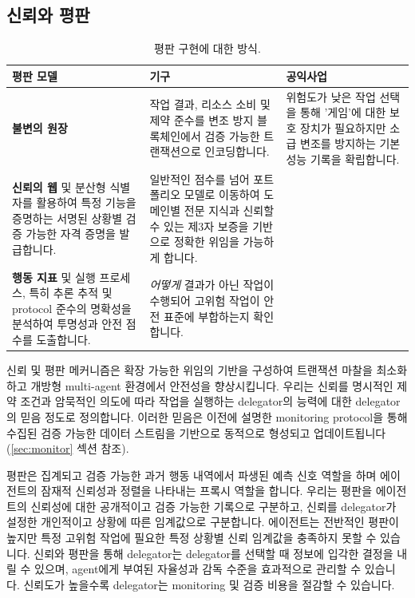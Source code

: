\documentclass[11pt, a4paper, twocolumn, copyright, goog]{google}
\begin{document}
\subsection{신뢰와 평판}
\label{sec:trust}

\begin{table}[t]
\caption{평판 구현에 대한 방식.}
\label{tab:reputation_approaches}
\centering
\begin{tabular*}{\textwidth}{@{\extracolsep{\fill}}lp{}p{}@{}}
\toprule
\textbf{평판 모델} & \textbf{기구} & \textbf{공익사업} \\ \midrule
\textbf{불변의 원장} & 작업 결과, 리소스 소비 및 제약 준수를 변조 방지 블록체인에서 검증 가능한 트랜잭션으로 인코딩합니다. & 위험도가 낮은 작업 선택을 통해 '게임'에 대한 보호 장치가 필요하지만 소급 변조를 방지하는 기본 성능 기록을 확립합니다. \\ \midrule
\textbf{신뢰의 웹} 및 분산형 식별자를 활용하여 특정 기능을 증명하는 서명된 상황별 검증 가능한 자격 증명을 발급합니다. & 일반적인 점수를 넘어 포트폴리오 모델로 이동하여 도메인별 전문 지식과 신뢰할 수 있는 제3자 보증을 기반으로 정확한 위임을 가능하게 합니다. \\ \midrule
\textbf{행동 지표} 및 실행 프로세스, 특히 추론 추적 및 protocol 준수의 명확성을 분석하여 투명성과 안전 점수를 도출합니다. & \emph{어떻게} 결과가 아닌 작업이 수행되어 고위험 작업이 안전 표준에 부합하는지 확인합니다. \\ \bottomrule
\end{tabular*}
\end{table}

신뢰 및 평판 메커니즘은 확장 가능한 위임의 기반을 구성하여 트랜잭션 마찰을 최소화하고 개방형 multi-agent 환경에서 안전성을 향상시킵니다. 우리는 신뢰를 명시적인 제약 조건과 암묵적인 의도에 따라 작업을 실행하는 delegator의 능력에 대한 delegator의 믿음 정도로 정의합니다. 이러한 믿음은 이전에 설명한 monitoring protocol을 통해 수집된 검증 가능한 데이터 스트림을 기반으로 동적으로 형성되고 업데이트됩니다(\ref{sec:monitor} 섹션 참조). 

평판은 집계되고 검증 가능한 과거 행동 내역에서 파생된 예측 신호 역할을 하며 에이전트의 잠재적 신뢰성과 정렬을 나타내는 프록시 역할을 합니다. 우리는 평판을 에이전트의 신뢰성에 대한 공개적이고 검증 가능한 기록으로 구분하고, 신뢰를 delegator가 설정한 개인적이고 상황에 따른 임계값으로 구분합니다. 에이전트는 전반적인 평판이 높지만 특정 고위험 작업에 필요한 특정 상황별 신뢰 임계값을 충족하지 못할 수 있습니다. 신뢰와 평판을 통해 delegator는 delegator를 선택할 때 정보에 입각한 결정을 내릴 수 있으며, agent에게 부여된 자율성과 감독 수준을 효과적으로 관리할 수 있습니다. 신뢰도가 높을수록 delegator는 monitoring 및 검증 비용을 절감할 수 있습니다.
\end{document}
